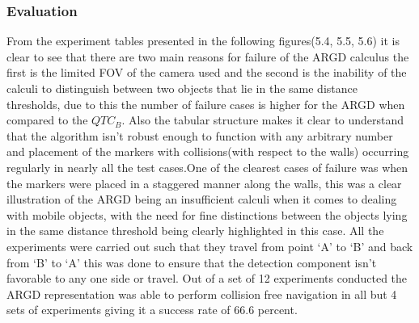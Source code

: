 \subsubsection*{Evaluation} From the experiment tables presented in the following figures(5.4, 5.5, 5.6) it is clear to see that there are two main reasons for failure of the ARGD calculus the first is the limited FOV of the camera used and the second is the inability of the calculi to distinguish between two objects that lie in the same distance thresholds, due to this the number of failure cases is higher for the ARGD when compared to the $QTC_B$. Also the tabular structure makes it clear to understand that the algorithm isn't robust enough to function with any arbitrary number and placement of the markers with collisions(with respect to the walls) occurring regularly in nearly all the test cases.One of the clearest cases of failure was when the markers were placed in a staggered manner along the walls, this was a clear illustration of the ARGD being an insufficient calculi when it comes to dealing with mobile objects, with the need for fine distinctions between the objects lying in the same distance threshold being clearly highlighted in this case. All the experiments were carried out such that they travel from point `A' to `B' and back from `B' to `A' this was done to ensure that the detection component isn't favorable to any one side or travel. Out of a set of 12 experiments conducted the ARGD representation was able to perform collision free navigation in all but 4 sets of experiments giving it a success rate of 66.6 percent.


